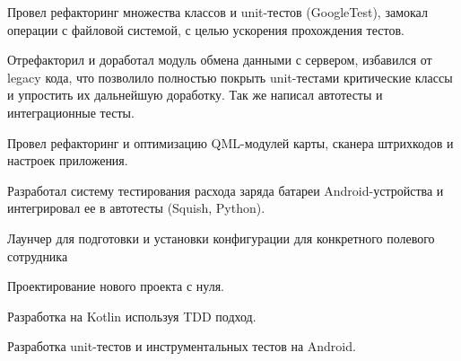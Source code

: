 \begin{cventries}
{\begin{cvitems}
        \item {Провел рефакторинг множества классов и unit-тестов (GoogleTest), замокал операции с файловой системой, с целью ускорения прохождения тестов.}
        \item {Отрефакторил и доработал модуль обмена данными с сервером, избавился от legacy кода, что позволило полностью покрыть unit-тестами критические классы
                и упростить их дальнейшую доработку. Так же написал автотесты и интеграционные тесты.}
        \item {Провел рефакторинг и оптимизацию QML-модулей карты, сканера штрихкодов и настроек приложения.}
        \item {Разработал систему тестирования расхода заряда батареи Android-устройства и интегрировал ее в автотесты (Squish, Python).}
    \end{cvitems}
    }

\cventry
    {Лаунчер для подготовки и установки конфигурации для конкретного полевого сотрудника}
    {}
    {}
    {}
    {
    \begin{cvitems}
        \item {Проектирование нового проекта с нуля.}
        \item {Разработка на Kotlin используя TDD подход.}
        \item {Разработка unit-тестов и инструментальных тестов на Android.}
    \end{cvitems}
    }

\end{cventries}
